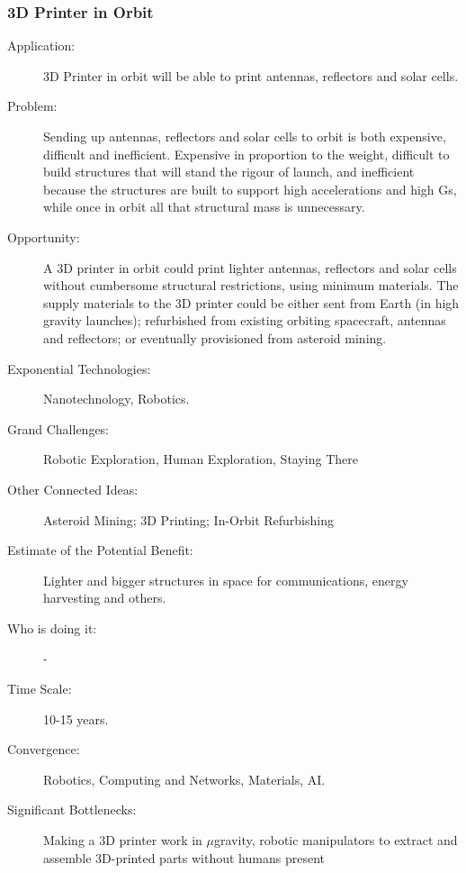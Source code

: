    \subsubsection{3D Printer in Orbit}
  
 \begin{description}  \item[Application:] 3D Printer in orbit will be able to print antennas,
reflectors  and solar cells.
 
   \item[Problem:] Sending up antennas, reflectors and solar cells to orbit  is
both expensive, difficult and  inefficient. Expensive in proportion to
the  weight, difficult to build structures that will stand the rigour of
launch,  and inefficient because the structures are built to support high
accelerations  and high Gs, while once in orbit all that structural mass
is  unnecessary.
 
   \item[Opportunity:] A 3D printer in orbit could print lighter antennas,
reflectors  and solar cells without cumbersome structural restrictions,
using  minimum materials. The supply materials to the 3D printer could be
either  sent from Earth (in high gravity launches); refurbished from existing
orbiting  spacecraft, antennas and reflectors; or eventually provisioned
from  asteroid mining.
 
   \item[Exponential Technologies:] Nanotechnology, Robotics.
 
   \item[Grand Challenges:] Robotic Exploration, Human Exploration,  Staying There
 
  \item[Other Connected Ideas:]  Asteroid Mining; 3D Printing; In-Orbit
Refurbishing
 
  \item[Estimate of the Potential  Benefit:]Lighter and bigger structures in
space for communications, energy  harvesting and others.
 
   \item[Who is doing it:] -
 
   \item[Time Scale:] 10-15 years.
 
   \item[Convergence:] Robotics, Computing and Networks, Materials, AI.
 
   \item[Significant Bottlenecks:] Making a 3D printer work in  $\mu$gravity, robotic manipulators to extract and assemble 3D-printed  parts without humans present
     \end{description}
     
